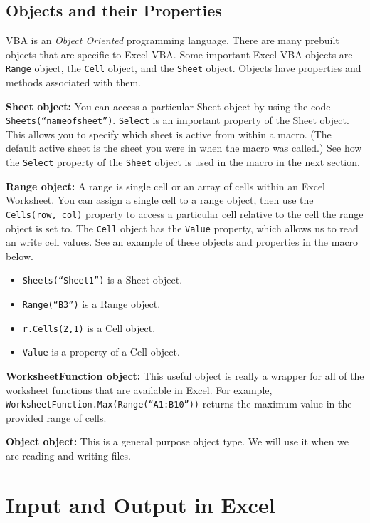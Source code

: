 \documentclass[10pt]{article}
\begin{document}
\subsection{Objects and their Properties}
VBA is an \emph{Object Oriented} programming language.  There
are many prebuilt objects that are specific to Excel VBA.  Some important Excel VBA objects are
{\tt Range} object, the {\tt Cell} object, and the {\tt Sheet} object.  Objects have properties and methods associated with
them.  

\textbf{Sheet object:}  You can access
a particular Sheet object by using the code {\tt Sheets(``nameofsheet'')}.  {\tt Select} is
an important property of the Sheet object.  This allows you to specify which
sheet is active from within a macro.  (The default active sheet is the sheet you 
were in when the macro was called.)  See how the {\tt Select} property of the {\tt Sheet}
object is used in the macro in the next section.

\textbf{Range object:} A range is single cell or an array of cells within an Excel Worksheet.
You can assign a single cell to a range object, then use the  {\tt Cells(row, col)} property
to access a particular cell relative to the cell the range object is set to.  
The {\tt Cell} object has the {\tt Value} property,
which allows us to read an write cell values.
See an example of these objects and properties in the macro below.

\begin{itemize}
\item  {\tt Sheets(``Sheet1'')} is a Sheet object. 
\item  {\tt Range(``B3'')} is a Range object.
\item  {\tt r.Cells(2,1)} is a Cell object. 
\item  {\tt Value} is a property of a Cell object.
\end{itemize}

\textbf{WorksheetFunction object:}  This useful object is really a wrapper for all of the worksheet functions that are available in Excel.  For example, {\tt WorksheetFunction.Max(Range(``A1:B10''))} returns the maximum value in the provided range of cells.  

\textbf{Object object:}  This is a general purpose object type.  We will use it when we are reading and writing files.


\section{Input and Output in Excel}
\label{sec:io}
\end{document}
